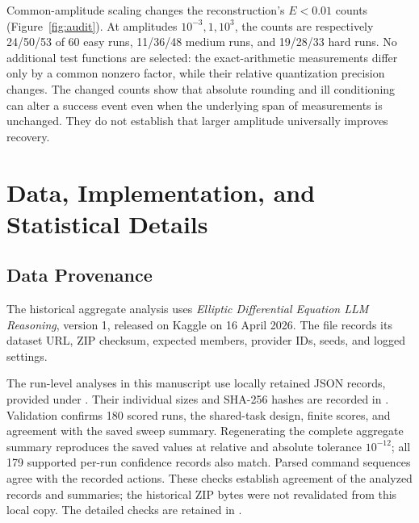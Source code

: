 \documentclass{article}
\begin{document}
Common-amplitude scaling changes the reconstruction's \(E<0.01\) counts
(Figure~\ref{fig:audit}). At amplitudes \(10^{-3},1,10^3\), the counts
are respectively 24/50/53 of 60 easy runs, 11/36/48 medium runs, and 19/28/33
hard runs. No additional test functions are selected: the exact-arithmetic measurements
differ only by a common nonzero factor, while their relative quantization
precision changes.
The changed counts show that absolute rounding and ill conditioning can alter
a success event even when the underlying span of measurements is unchanged.
They do not establish that larger amplitude universally improves recovery.

\FloatBarrier
\section{Data, Implementation, and Statistical Details}
\label{app:repro}

\subsection{Data Provenance}

The historical aggregate analysis uses \emph{Elliptic Differential Equation
LLM Reasoning}, version 1, released on Kaggle on 16 April 2026. The
 file records its dataset URL, ZIP
checksum, expected members, provider IDs, seeds, and logged settings.

The run-level analyses in this manuscript use locally retained JSON records,
provided under . Their individual sizes and SHA-256
hashes are recorded in . Validation confirms
180 scored runs, the shared-task design, finite scores, and agreement with the
saved sweep summary. Regenerating the complete aggregate summary reproduces the
saved values at relative and absolute tolerance \(10^{-12}\); all 179 supported
per-run confidence records also match. Parsed command sequences agree with the
recorded actions. These checks establish agreement of the analyzed records and
summaries; the historical ZIP bytes were not revalidated from this local copy.
The detailed checks are retained in
.
\end{document}
